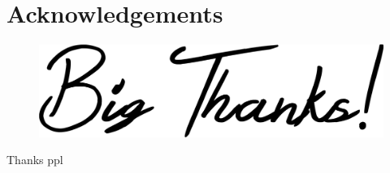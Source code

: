 \section{Acknowledgements}

\vspace*{\fill}
\begin{figure}[H]
    \center
    \includegraphics[width=0.8\linewidth]{ch.appendix/imgs/bigthanks.png}
\end{figure}
\vspace*{\fill}

\newpage

Thanks ppl

\newpage